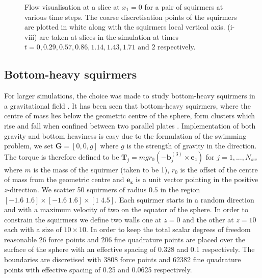 \begin{figure}
\begin{subfigure}[b]{0.328\textwidth}
    \caption[]{\label{fig:PairH}}
\end{subfigure}
\caption[Flow visualisation around a pair of squirmers.]{\label{fig:Squiremer3DFlowPair} Flow visualisation at a slice at $x_1=0$ for a pair of squirmers at various time steps. The coarse discretisation points of the squirmers are plotted in white along with the squirmers local vertical axis. (i-viii) are taken at slices in the simulation at times $t = 0, 0.29, 0.57, 0.86, 1.14, 1.43, 1.71 \text{ and } 2$ respectively.}
\vspace{-1pt}
\end{figure}

\subsection{Bottom-heavy squirmers} \label{subsec:BottomHeavySquirmers}

For larger simulations, the choice was made to study bottom-heavy squirmers in a gravitational field \cite{Ruhle2020EmergentGravity,BrumleyStabilitySquirmers,Pedley2016SphericalMicro-organisms}. It has been seen that bottom-heavy squirmers, where the centre of mass lies below the geometric centre of the sphere, form clusters which rise and fall when confined between two parallel plates \cite{Ruhle2020EmergentGravity}. Implementation of both gravity and bottom heaviness is easy due to the formulation of the swimming problem, we set $\bm{G}=[0,0,g]$ where $g$ is the strength of gravity in the  direction. The torque is therefore defined to be $\bm{T}_j =  m g r_0 ( -\bm{b}_j^{(3)} \times \bm{e}_z)$ for $j=1,...,N_{sw}$ where $m$ is the mass of the squirmer (taken to be 1), $r_0$ is the offset of the centre of mass from the geometric centre and $\bm{e_z}$ is a unit vector pointing in the positive $z$-direction. We scatter 50 squirmers of radius $0.5$ in the region $[-1.6\; 1.6] \times [-1.6\; 1.6] \times [1\; 4.5]$. Each squirmer starts in a random direction and with a maximum velocity of two on the equator of the sphere. In order to constrain the squirmers we define two walls one at $z=0$ and the other at $z=10$ each with a size of $10 \times 10$. In order to keep the total scalar degrees of freedom reasonable 26 force points and 206 fine quadrature points are placed over the surface of the sphere with an effective spacing of 0.328 and 0.1 respectively. The boundaries are discretised with 3808 force points and 62382 fine quadrature points with effective spacing of 0.25 and 0.0625 respectively. 

